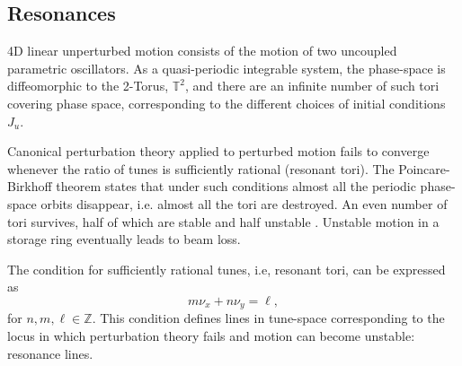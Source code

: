 \subsection{Resonances}
\label{subsec:resons}

4D linear unperturbed motion consists of the motion of two uncoupled parametric oscillators. As a quasi-periodic integrable system, the phase-space is diffeomorphic to the 2-Torus, $\mathbb{T}^2$, and there are an infinite number of such tori covering phase space, corresponding to the different choices of initial conditions $J_u$.

Canonical perturbation theory applied to perturbed motion fails to converge whenever the ratio of tunes is sufficiently rational (resonant tori). The Poincare-Birkhoff theorem states that under such conditions almost all the periodic phase-space orbits disappear, i.e. almost all the tori are destroyed. An even number of tori survives, half of which are stable and half unstable \cite[section 10.2]{marcus_mecanica2023}. Unstable motion in a storage ring eventually leads to beam loss.

The condition for sufficiently rational tunes, i.e, resonant tori, can be expressed as
\begin{equation}
        m\nu_x + n\nu_y = \ell,
        \label{eq:resonance_condition}
\end{equation}
    for $n, m, \ell\in\mathbb{Z}$. This condition defines lines in tune-space corresponding to the locus in which perturbation theory fails and motion can become unstable: resonance lines.

